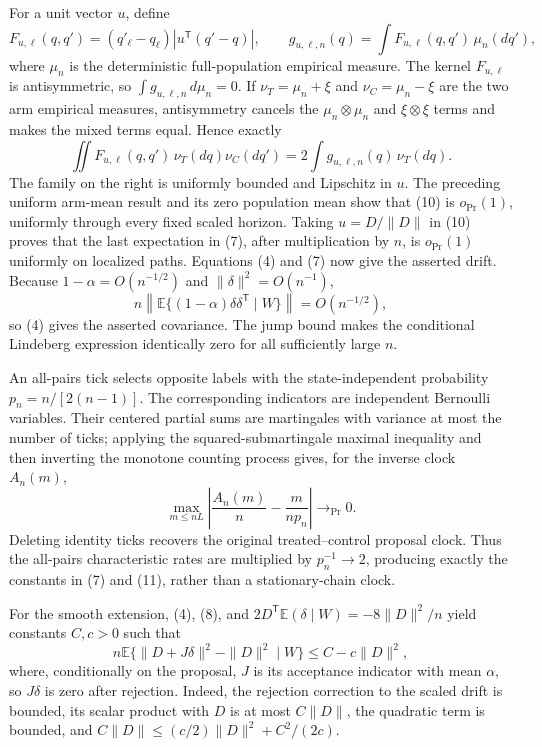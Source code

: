 For a unit vector \(u\), define
\[
 F_{u,\ell}(q,q')=(q'_{\ell}-q_{\ell})|u^{\mathsf T}(q'-q)|,
 \qquad g_{u,\ell,n}(q)=\int F_{u,\ell}(q,q')\,\mu_n(dq'), \tag{9}
\]
where \(\mu_n\) is the deterministic full-population empirical measure.  The kernel \(F_{u,\ell}\) is antisymmetric, so \(\int g_{u,\ell,n}\,d\mu_n=0\).  If \(\nu_T=\mu_n+\xi\) and \(\nu_C=\mu_n-\xi\) are the two arm empirical measures, antisymmetry cancels the \(\mu_n\otimes\mu_n\) and \(\xi\otimes\xi\) terms and makes the mixed terms equal.  Hence exactly
\[
 \iint F_{u,\ell}(q,q')\,\nu_T(dq)\nu_C(dq')
 =2\int g_{u,\ell,n}(q)\,\nu_T(dq). \tag{10}
\]
The family on the right is uniformly bounded and Lipschitz in \(u\).  The preceding uniform arm-mean result and its zero population mean show that (10) is \(o_{\Pr}(1)\), uniformly through every fixed scaled horizon.  Taking \(u=D/\|D\|\) in (10) proves that the last expectation in (7), after multiplication by \(n\), is \(o_{\Pr}(1)\) uniformly on localized paths.  Equations (4) and (7) now give the asserted drift.  Because \(1-\alpha=O(n^{-1/2})\) and \(\|\delta\|^2=O(n^{-1})\),
\[
 n\left\|\mathbb E\{(1-\alpha)\delta\delta^{\mathsf T}\mid W\}\right\|=O(n^{-1/2}), \tag{11}
\]
so (4) gives the asserted covariance.  The jump bound makes the conditional Lindeberg expression identically zero for all sufficiently large \(n\).

An all-pairs tick selects opposite labels with the state-independent probability \(p_n=n/[2(n-1)]\).  The corresponding indicators are independent Bernoulli variables.  Their centered partial sums are martingales with variance at most the number of ticks; applying the squared-submartingale maximal inequality and then inverting the monotone counting process gives, for the inverse clock \(A_n(m)\),
\[
 \max_{m\le nL}\left|\frac{A_n(m)}n-\frac{m}{np_n}\right|\longrightarrow_{\Pr}0. \tag{12}
\]
Deleting identity ticks recovers the original treated--control proposal clock.  Thus the all-pairs characteristic rates are multiplied by \(p_n^{-1}\to2\), producing exactly the constants in (7) and (11), rather than a stationary-chain clock.

For the smooth extension, (4), (8), and \(2D^{\mathsf T}\mathbb E(\delta\mid W)=-8\|D\|^2/n\) yield constants \(C,c>0\) such that
\[
 n\mathbb E\{\|D+J\delta\|^2-\|D\|^2\mid W\}
 \le C-c\|D\|^2, \tag{13}
\]
where, conditionally on the proposal, \(J\) is its acceptance indicator with mean \(\alpha\), so \(J\delta\) is zero after rejection.  Indeed, the rejection correction to the scaled drift is bounded, its scalar product with \(D\) is at most \(C\|D\|\), the quadratic term is bounded, and \(C\|D\|\le(c/2)\|D\|^2+C^2/(2c)\).

